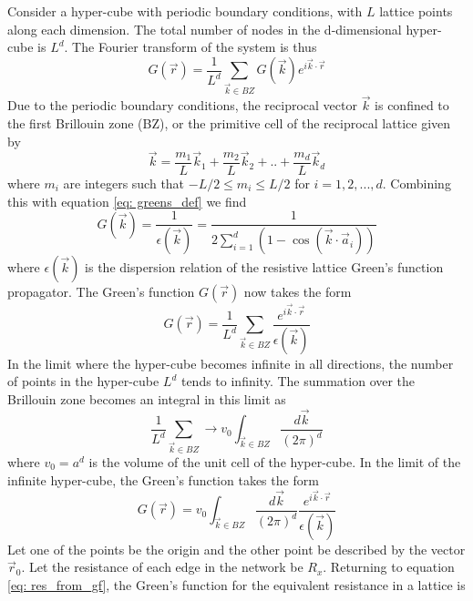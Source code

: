 Consider a hyper-cube with periodic boundary conditions, with $L$ lattice points along each dimension. The total number of nodes in the d-dimensional hyper-cube is $L^d$. The Fourier transform of the system is thus
\begin{equation}
G(\vec{r}) = \frac{1}{L^d} \sum_{\vec{k} \in BZ} G(\vec{k})e^{i \vec{k} \cdot \vec{r}}
\end{equation}
Due to the periodic boundary conditions, the reciprocal vector $\vec{k}$ is confined to the first Brillouin zone (BZ), or the primitive cell of the reciprocal lattice given by
\begin{equation}
\vec{k} = \frac{m_1}{L} \vec{k}_1+\frac{m_2}{L} \vec{k}_2 + .. + \frac{m_d}{L} \vec{k}_d
\end{equation}
where $m_i$ are integers such that  $-L/2 \leq m_i \leq L/2$ for $i = 1,2,...,d$. Combining this with equation \ref{eq: greens_def} we find 
\begin{equation}
G(\vec{k}) = \frac{1}{\epsilon(\vec{k})} = \frac{1}{2 \sum_{i=1}^{d} ( 1 - \cos (\vec{k} \cdot \vec{a}_\textit{i}))}
\end{equation}
where $\epsilon(\vec{k})$ is the dispersion relation of the resistive lattice Green's function propagator. The Green's function $G(\vec{r})$ now takes the form
\begin{equation}
G(\vec{r}) = \frac{1}{L^d}\sum_{\vec{k} \in BZ} \frac{e^{i \vec{k}\cdot \vec{r}}}{\epsilon(\vec{k})}
\label{eq: greens_func_sum}
\end{equation}
In the limit where the hyper-cube becomes infinite in all directions, the number of points in the hyper-cube $L^d$ tends to infinity. The summation over the Brillouin zone becomes an integral in this limit as
\begin{equation}
\frac{1}{L^d} \sum_{\vec{k} \in BZ} \rightarrow v_0 \int_{\vec{k} \in BZ} \frac{d \vec{k}}{(2 \pi)^d} 
\end{equation}
where $v_0 = a^d$ is the volume of the unit cell of the hyper-cube. In the limit of the infinite hyper-cube, the Green's function takes the form
\begin{equation}
G(\vec{r}) =v_0 \int_{\vec{k} \in BZ} \frac{d \vec{k}}{(2 \pi)^d}  \frac{e^{i \vec{k}\cdot \vec{r}}}{\epsilon(\vec{k})}
\end{equation}
Let one of the points be the origin and the other point be described by the vector $\vec{r}_0$. Let the resistance of each edge in the network be $R_x$. Returning to equation \ref{eq: res_from_gf}, the Green's function for the equivalent resistance in a lattice is
